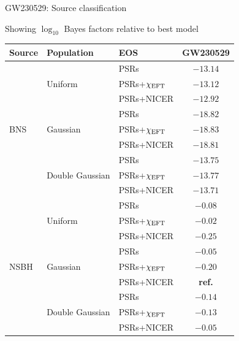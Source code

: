 \documentclass[usenames,dvipsnames,t]{beamer}
\begin{document}
\begin{frame}{GW230529: Source classification}

  Showing $\log_{10}$ Bayes factors relative to best model

  \vspace{3mm}

  \begin{table}
    \centering
    \scriptsize
    \begin{tabular}{|l|l|l|c|}
    \hline
    \textbf{Source} & \textbf{Population} & \textbf{EOS} & \textbf{GW230529} \\
    \hline\hline
    \multirow{9}{*}{BNS} & \multirow{3}{*}{Uniform} & PSRs & \cellcolor{jeffreysred5}$-13.14$ \\
    \cline{3-4}
     &  & PSRs+$\chi_{\rm{EFT}}$ & \cellcolor{jeffreysred5}$-13.12$ \\
    \cline{3-4}
     &  & PSRs+NICER & \cellcolor{jeffreysred5}$-12.92$ \\
    \cline{2-4}
     & \multirow{3}{*}{Gaussian} & PSRs & \cellcolor{jeffreysred5}$-18.82$ \\
    \cline{3-4}
     &  & PSRs+$\chi_{\rm{EFT}}$ & \cellcolor{jeffreysred5}$-18.83$ \\
    \cline{3-4}
     &  & PSRs+NICER & \cellcolor{jeffreysred5}$-18.81$ \\
    \cline{2-4}
     & \multirow{3}{*}{Double Gaussian} & PSRs & \cellcolor{jeffreysred5}$-13.75$ \\
    \cline{3-4}
     &  & PSRs+$\chi_{\rm{EFT}}$ & \cellcolor{jeffreysred5}$-13.77$ \\
    \cline{3-4}
     &  & PSRs+NICER & \cellcolor{jeffreysred5}$-13.71$ \\
    \hline\hline
    \multirow{9}{*}{NSBH} & \multirow{3}{*}{Uniform} & PSRs & \cellcolor{jeffreysred1}$-0.08$ \\
    \cline{3-4}
     &  & PSRs+$\chi_{\rm{EFT}}$ & \cellcolor{jeffreysred1}$-0.02$ \\
    \cline{3-4}
     &  & PSRs+NICER & \cellcolor{jeffreysred1}$-0.25$ \\
    \cline{2-4}
     & \multirow{3}{*}{Gaussian} & PSRs & \cellcolor{jeffreysred1}$-0.05$ \\
    \cline{3-4}
     &  & PSRs+$\chi_{\rm{EFT}}$ & \cellcolor{jeffreysred1}$-0.20$ \\
    \cline{3-4}
     &  & PSRs+NICER & \textbf{ref.} \\
    \cline{2-4}
     & \multirow{3}{*}{Double Gaussian} & PSRs & \cellcolor{jeffreysred1}$-0.14$ \\
    \cline{3-4}
     &  & PSRs+$\chi_{\rm{EFT}}$ & \cellcolor{jeffreysred1}$-0.13$ \\
    \cline{3-4}
     &  & PSRs+NICER & \cellcolor{jeffreysred1}$-0.05$ \\
    \hline
    \end{tabular}
  \end{table}
\end{frame}
\end{document}
